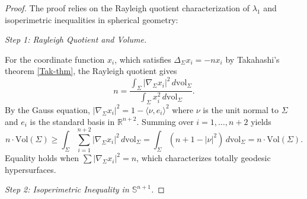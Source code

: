 \documentclass[a4, 12pt]{amsart}
\numberwithin{equation}{section} \numberwithin{equation}{section}
\begin{document}
\begin{proof}
The proof relies on the Rayleigh quotient characterization of $\lambda_1$ and isoperimetric inequalities in spherical geometry:

\textit{Step 1: Rayleigh Quotient and Volume.}

For the coordinate function $x_i$, which satisfies $\Delta_\Sigma x_i = -n x_i$ by Takahashi's theorem \ref{Tak-thm}, the Rayleigh quotient gives
\begin{equation*}
n = \frac{\int_\Sigma |\nabla_\Sigma x_i|^2 \, d\mathrm{vol}_\Sigma}{\int_\Sigma x_i^2 \, d\mathrm{vol}_\Sigma}.
\end{equation*}
By the Gauss equation, $|\nabla_\Sigma x_i|^2 = 1-\langle \nu, e_i \rangle^2$ where $\nu$ is the unit normal to $\Sigma$ and $e_i$ is the standard basis in $\mathbb{R}^{n+2}$. Summing over $i=1,\dots,n+2$ yields
\begin{equation*}
n \cdot \text{Vol}(\Sigma) \geq \int_\Sigma \sum_{i=1}^{n+2} |\nabla_\Sigma x_i|^2 \, d\mathrm{vol}_\Sigma = \int_\Sigma (n + 1-|\nu|^2) \, d\mathrm{vol}_\Sigma = n \cdot \text{Vol}(\Sigma).
\end{equation*}
Equality holds when $\sum |\nabla_\Sigma x_i|^2 = n$, which characterizes totally geodesic hypersurfaces.

\textit{Step 2: Isoperimetric Inequality in $\mathbb{S}^{n+1}$.}


\end{proof}
\end{document}
